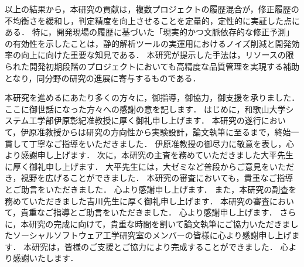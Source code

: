 \documentclass[11pt]{jreport}
\begin{document}
以上の結果から，本研究の貢献は，複数プロジェクトの履歴混合が，修正履歴の不均衡さを緩和し，判定精度を向上させることを定量的，定性的に実証した点にある．
特に，開発現場の履歴に基づいた「現実的かつ文脈依存的な修正予測」の有効性を示したことは，静的解析ツールの実運用におけるノイズ削減と開発効率の向上に向けた重要な知見である．
本研究が提示した手法は，リソースの限られた開発初期段階のプロジェクトにおいても高精度な品質管理を実現する補助となり，同分野の研究の進展に寄与するものである．



\begin{acknowledgements}

本研究を進めるにあたり多くの方々に，御指導，御協力，御支援を承りました．ここに御世話になった方々への感謝の意を記します．
はじめに，和歌山大学システム工学部伊原彰紀准教授に厚く御礼申し上げます．
本研究の遂行において，伊原准教授からは研究の方向性から実験設計，論文執筆に至るまで，終始一貫して丁寧なご指導をいただきました．
伊原准教授の御尽力に敬意を表し，心より感謝申し上げます．
次に，本研究の主査を務めていただきました大平先生に厚く御礼申し上げます．
大平先生には，大ゼミなど普段からご意見をいただき，視野を広げることができました．
本研究の審査においても，貴重なご指導とご助言をいただきました．
心より感謝申し上げます．
また，本研究の副査を務めていただきました吉川先生に厚く御礼申し上げます．
本研究の審査において，貴重なご指導とご助言をいただきました．
心より感謝申し上げます．
さらに，本研究の完成に向けて，貴重な時間を割いて論文執筆にご協力いただきましたソーシャルソフトウェア工学研究室のメンバーの皆様に心より感謝申し上げます．
本研究は，皆様のご支援とご協力により完成することができました．
心より感謝いたします．

\end{acknowledgements}




\end{document}
